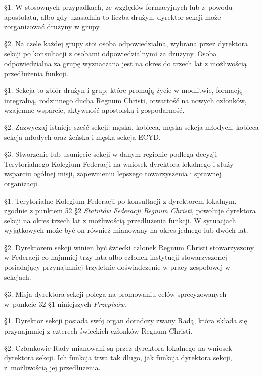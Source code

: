 
 \S{}1. W stosownych przypadkach, ze względów formacyjnych lub \mbox{z powodu} apostolatu, albo gdy uzasadnia to liczba drużyn, dyrektor sekcji może zorganizować drużyny w grupy.

\S{}2. Na czele każdej grupy stoi osoba odpowiedzialna, wybrana przez dyrektora sekcji po konsultacji z osobami odpowiedzialnymi za drużyny. Osoba odpowiedzialna za grupę wyznaczana jest na okres do trzech lat z możliwością przedłużenia funkcji.


 \S{}1. Sekcja to zbiór drużyn i grup, które promują życie w modlitwie, formację integralną, rodzinnego ducha Regnum Christi, otwartość na nowych członków, wzajemne wsparcie, aktywność apostolską i gospodarność.

\S{}2. Zazwyczaj istnieje sześć sekcji: męska, kobieca, męska sekcja młodych, kobieca sekcja młodych oraz żeńska i męska sekcja ECYD.

\S{}3. Stworzenie lub usunięcie sekcji w danym regionie podlega decyzji Terytorialnego Kolegium Federacji na wniosek dyrektora lokalnego i służy wsparciu ogólnej misji, zapewnieniu lepszego towarzyszenia i sprawnej organizacji.


 \S{}1. Terytorialne Kolegium Federacji po konsultacji z dyrektorem lokalnym, zgodnie z punktem 52 \S{}2 {\em Statutów Federacji Regnum Christi}, powołuje dyrektora sekcji na okres trzech lat z możliwością przedłużenia funkcji. W sytuacjach wyjątkowych może być on również mianowany na okres jednego lub dwóch lat.

\S{}2. Dyrektorem sekcji winien być świecki członek Regnum Christi stowarzyszony w Federacji co najmniej trzy lata albo członek instytucji stowarzyszonej posiadający przynajmniej trzyletnie doświadczenie w pracy zespołowej w sekcjach.

\S{}3. Misja dyrektora sekcji polega na promowaniu celów sprecyzowanych \mbox{w punkcie} 32 \S{}1 niniejszych {\em Przepisów}.


 \S{}1. Dyrektor sekcji posiada swój organ doradczy zwany Radą, która składa się przynajmniej z czterech świeckich członków Regnum Christi.

\S{}2. Członkowie Rady mianowani są przez dyrektora lokalnego na wniosek dyrektora sekcji. Ich funkcja trwa tak długo, jak funkcja dyrektora sekcji, \mbox{z możliwością} jej przedłużenia.

